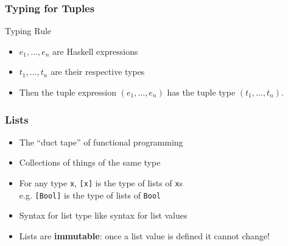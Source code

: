 \documentclass{beamer}
\begin{document}
\begin{frame}
  \frametitle{Typing for Tuples}
  \begin{block}{Typing Rule}
    \begin{mathpar}
    \end{mathpar}
    \begin{itemize}
    \item $e_1, \dots, e_n$ are Haskell expressions
    \item $t_1, \dots, t_n$ are their respective types
    \item Then the tuple expression $(e_1, \dots, e_n)$ has the tuple
      type $(t_1, \dots, t_n)$.
    \end{itemize}
  \end{block}
\end{frame}
\begin{frame}
  \frametitle{Lists}
  \begin{itemize}
  \item The “duct tape” of functional programming
  \item Collections of things of the same type 
  \item 
    For any type \lstinline{x}, \lstinline{[x]} is the type of lists of \lstinline{x}s
    \\ e.g. \lstinline{[Bool]} is the type of lists of \lstinline{Bool}
  \item Syntax for list type like syntax for list values
  \item Lists are \textbf{immutable}: once a list value is defined it cannot change!
  \end{itemize}
\end{frame}
\end{document}
